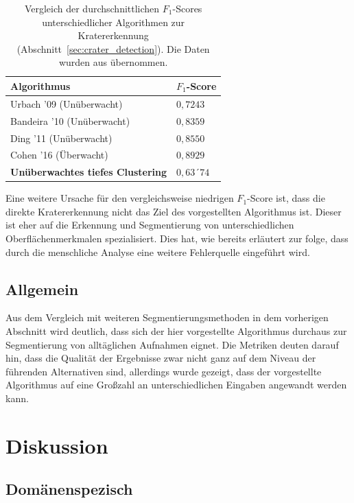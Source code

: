 \begin{table}[H]
	\begin{tabularx}{\textwidth}{p{} >{\centering\arraybackslash}p{}}
		\toprule
		\textbf{Algorithmus} & \textbf{$F_1$-Score} \\
		\midrule
		Urbach '09 \cite{urbach_stepinski_2009} (Unüberwacht) & $0,7243$ \\
		Bandeira '10 \cite{bandeira_10} (Unüberwacht) & $0,8359$ \\
		Ding '11 \cite{ding_11} (Unüberwacht) & $0,8550$ \\
		Cohen '16 \cite{cohen_16} (Überwacht) & $0,8929$ \\
		\textbf{Unüberwachtes tiefes Clustering} & $0,63´74$\\
		\bottomrule
	\end{tabularx}
	\caption{Vergleich der durchschnittlichen $F_1$-Scores unterschiedlicher Algorithmen zur Kratererkennung (\vgl Abschnitt~\ref{sec:crater_detection}). Die Daten wurden aus \cite{cohen_16} übernommen.}
	\label{tab:f1_comparision}
\end{table}

Eine weitere Ursache für den vergleichsweise niedrigen $F_1$-Score ist, dass die direkte Kratererkennung nicht das Ziel des vorgestellten Algorithmus ist. Dieser ist eher auf die Erkennung und Segmentierung von unterschiedlichen Oberflächenmerkmalen spezialisiert. Dies hat, wie bereits erläutert zur folge, dass durch die menschliche Analyse eine weitere Fehlerquelle eingeführt wird.

\subsection{Allgemein}
Aus dem Vergleich mit weiteren Segmentierungsmethoden in dem vorherigen Abschnitt wird deutlich, dass sich der hier vorgestellte Algorithmus durchaus zur Segmentierung von alltäglichen Aufnahmen eignet. Die Metriken deuten darauf hin, dass die Qualität der Ergebnisse zwar nicht ganz auf dem Niveau der führenden Alternativen sind, allerdings wurde gezeigt, dass der vorgestellte Algorithmus auf eine Großzahl an unterschiedlichen Eingaben angewandt werden kann.

\section{Diskussion}
\label{sec:discussion}

\subsection{Domänenspezisch}

